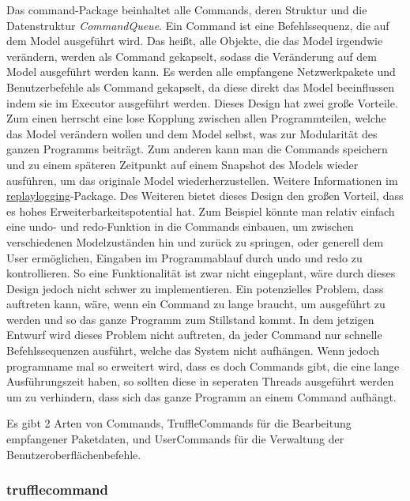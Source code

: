 \medskip
Das command-Package beinhaltet alle Commands, deren Struktur und die Datenstruktur
\textit{CommandQueue}. Ein Command ist eine Befehlssequenz, die auf
dem Model ausgeführt wird. Das heißt, alle Objekte, die das Model irgendwie verändern,
werden als Command gekapselt, sodass die Veränderung auf dem Model
ausgeführt werden kann. Es werden alle empfangene Netzwerkpakete
und Benutzerbefehle als Command gekapselt, da diese direkt das Model beeinflussen
indem sie im Executor ausgeführt werden.
\newline
\newline
Dieses Design hat zwei große Vorteile. Zum einen herrscht eine lose Kopplung zwischen
allen Programmteilen, welche das Model verändern wollen und dem Model selbst, was zur Modularität des ganzen
Programms beiträgt. Zum anderen kann man die Commands speichern und zu einem
späteren Zeitpunkt auf einem Snapshot des Models wieder ausführen, um das originale
Model wiederherzustellen. Weitere Informationen im
\hyperref[subsubsec:replaylogging]{replaylogging}-Package. Des Weiteren bietet dieses
Design den großen Vorteil, dass es hohes Erweiterbarkeitspotential hat. Zum Beispiel
könnte man relativ einfach eine undo- und redo-Funktion in die Commands einbauen, um
zwischen verschiedenen Modelzuständen hin und zurück zu springen, oder generell dem User ermöglichen, Eingaben im Programmablauf durch undo und redo zu kontrollieren. So eine
Funktionalität ist zwar nicht eingeplant, wäre durch dieses Design jedoch nicht schwer zu implementieren.
\newline
\newline
Ein potenzielles Problem, dass auftreten kann, wäre, wenn ein Command zu lange braucht, um
ausgeführt zu werden und so das ganze Programm zum Stillstand kommt.
In dem jetzigen Entwurf wird dieses Problem nicht auftreten, da jeder Command
nur schnelle Befehlssequenzen ausführt, welche das System nicht
aufhängen. Wenn jedoch \gls{programname} mal so erweitert wird, dass es doch Commands gibt,
die eine lange Ausführungszeit haben, so sollten diese in seperaten Threads
ausgeführt werden um zu verhindern, dass sich das ganze Programm an einem Command
aufhängt.

Es gibt 2 Arten von Commands, TruffleCommands für die Bearbeitung empfangener
Paketdaten, und UserCommands für die Verwaltung der Benutzeroberflächenbefehle.

      \subsubsection{trufflecommand}
      \label{subsubsec:trufflecommand}

